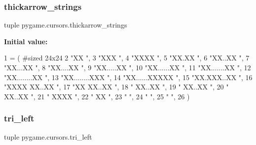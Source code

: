 \subsubsection{\texorpdfstring{thickarrow\+\_\+strings}{thickarrow\_strings}}
{\footnotesize\ttfamily tuple pygame.\+cursors.\+thickarrow\+\_\+strings}

{\bfseries Initial value\+:}
\begin{DoxyCode}
1 =  (               \textcolor{comment}{#sized 24x24}
2   \textcolor{stringliteral}{"XX                      "},
3   \textcolor{stringliteral}{"XXX                     "},
4   \textcolor{stringliteral}{"XXXX                    "},
5   \textcolor{stringliteral}{"XX.XX                   "},
6   \textcolor{stringliteral}{"XX..XX                  "},
7   \textcolor{stringliteral}{"XX...XX                 "},
8   \textcolor{stringliteral}{"XX....XX                "},
9   \textcolor{stringliteral}{"XX.....XX               "},
10   \textcolor{stringliteral}{"XX......XX              "},
11   \textcolor{stringliteral}{"XX.......XX             "},
12   \textcolor{stringliteral}{"XX........XX            "},
13   \textcolor{stringliteral}{"XX........XXX           "},
14   \textcolor{stringliteral}{"XX......XXXXX           "},
15   \textcolor{stringliteral}{"XX.XXX..XX              "},
16   \textcolor{stringliteral}{"XXXX XX..XX             "},
17   \textcolor{stringliteral}{"XX   XX..XX             "},
18   \textcolor{stringliteral}{"     XX..XX             "},
19   \textcolor{stringliteral}{"      XX..XX            "},
20   \textcolor{stringliteral}{"      XX..XX            "},
21   \textcolor{stringliteral}{"       XXXX             "},
22   \textcolor{stringliteral}{"       XX               "},
23   \textcolor{stringliteral}{"                        "},
24   \textcolor{stringliteral}{"                        "},
25   \textcolor{stringliteral}{"                        "},
26 )
\end{DoxyCode}
\mbox{\label{namespacepygame_1_1cursors_ab8f9d468f408955fabc83a987ec5d043}} 
\subsubsection{\texorpdfstring{tri\+\_\+left}{tri\_left}}
{\footnotesize\ttfamily tuple pygame.\+cursors.\+tri\+\_\+left}

